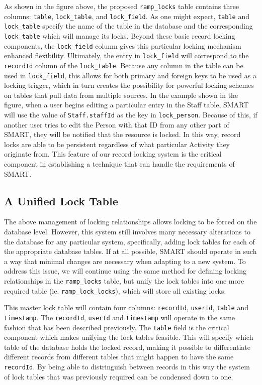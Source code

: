 \documentclass[12pt]{article}
\newcommand{\code}[1]{\texttt{#1}}
\begin{document}
As shown in the figure above, the proposed \code{ramp\_locks} table contains three columns: \code{table}, \code{lock\_table}, and \code{lock\_field}. As one might expect, \code{table} and \code{lock\_table} specify the name of the table in the database and the corresponding \code{lock\_table} which will manage its locks. Beyond these basic record locking components, the \code{lock\_field} column gives this particular locking mechanism enhanced flexibility. Ultimately, the entry in \code{lock\_field} will correspond to the \code{recordId} column of the \code{lock\_table}. Because any column in the table can be used in \code{lock\_field}, this allows for both primary and foreign keys to be used as a locking trigger, which in turn creates the possibility for powerful locking schemes on tables that pull data from multiple sources. In the example shown in the figure, when a user begins editing a particular entry in the Staff table, SMART will use the value of \code{Staff.staffId} as the key in \code{lock\_person}. Because of this, if another user tries to edit the Person with that ID from any other part of SMART, they will be notified that the resource is locked. In this way, record locks are able to be persistent regardless of what particular Activity they originate from. This feature of our record locking system is the critical component in establishing a technique that can handle the requirements of SMART.

\subsection{A Unified Lock Table}
The above management of locking relationships allows locking to be forced on the database level. However, this system still involves many necessary alterations to the database for any particular system, specifically, adding lock tables for each of the appropriate database tables. If at all possible, SMART should operate in such a way that minimal changes are necessary when adapting to a new system. To address this issue, we will continue using the same method for defining locking relationships in the \code{ramp\_locks} table, but unify the lock tables into one more required table (ie. \code{ramp\_lock\_locks}), which will store all existing locks.

This master lock table will contain four columns: \code{recordId}, \code{userId}, \code{table} and \code{timestamp}. The \code{recordId}, \code{userId} and \code{timestamp} will operate in the same fashion that has been described previously. The \code{table} field is the critical component which makes unifying the lock tables feasible. This will specify which table of the database holds the locked record, making it possible to differentiate different records from different tables that might happen to have the same \code{recordId}. By being able to distringuish between records in this way the system of lock tables that was previously required can be condensed down to one.
\end{document}
